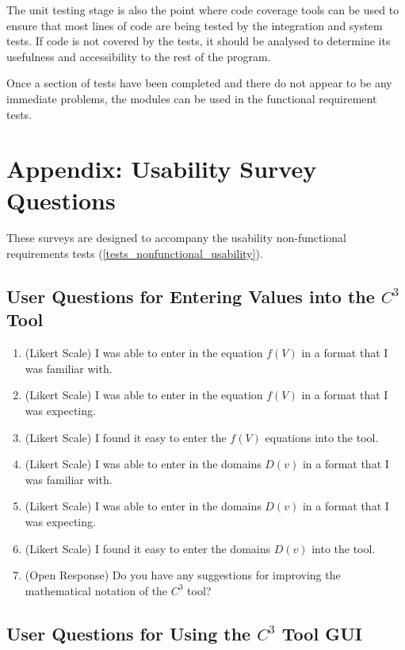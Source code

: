 \documentclass[12pt, titlepage]{article}
\newcommand{\prognameAbbrv}{$C^{3}$}
\begin{document}
The unit testing stage is also the point where code coverage tools can be used 
to ensure that most lines of code are being tested by the integration and 
system tests. If code is not covered by the tests, it should be analysed to 
determine its usefulness and accessibility to the rest of the program.

Once a section of tests have been completed and there do not appear to be any 
immediate problems, the modules can be used in the functional requirement tests.

%

%

\newpage

\section{Appendix: Usability Survey Questions}
These surveys are designed to accompany the usability non-functional 
requirements tests (\ref{tests_nonfunctional_usability}).

\subsection{User Questions for Entering Values into the \prognameAbbrv{} 
Tool}
\label{questions_inputs}

\begin{enumerate}
	\item (Likert Scale) I was able to enter in the equation $f(V)$ in a format 
	that I was familiar with.
	\item (Likert Scale) I was able to enter in the equation $f(V)$ in a format 
	that I was expecting.
	\item (Likert Scale) I found it easy to enter the $f(V)$ equations into the 
	tool.
	\item (Likert Scale) I was able to enter in the domains $D(v)$ in a format 
	that I was familiar with.
	\item (Likert Scale) I was able to enter in the domains $D(v)$ in a format 
	that I was expecting.
	\item (Likert Scale) I found it easy to enter the domains $D(v)$ into the 
	tool.
	\item (Open Response) Do you have any suggestions for improving the 
	mathematical notation of the \prognameAbbrv{} tool?
\end{enumerate}

\subsection{User Questions for Using the \prognameAbbrv{} Tool GUI}
\label{questions_GUI}
\end{document}
